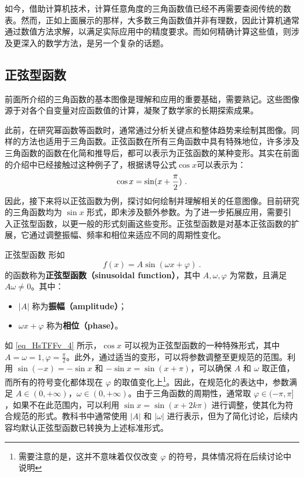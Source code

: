 如今，借助计算机技术，计算任意角度的三角函数值已经不再需要查阅传统的数表。然而，正如上面展示的那样，大多数三角函数值并非有理数，因此计算机通常通过数值方法求解，以满足实际应用中的精度要求。而如何精确计算这些值，则涉及更深入的数学方法，是另一个复杂的话题。

\subsection{正弦型函数}

前面所介绍的三角函数的基本图像是理解和应用的重要基础，需要熟记。这些图像源于对各个自变量对应函数值的计算，凝聚了数学家的长期探索成果。

此前，在研究幂函数等函数时，通常通过分析关键点和整体趋势来绘制其图像。同样的方法也适用于三角函数。正弦函数在所有三角函数中具有特殊地位，许多涉及三角函数的函数在化简和推导后，都可以表示为正弦函数的某种变形。其实在前面的介绍中已经接触过这种例子了，根据诱导公式$\cos x$可以表示为：
\begin{equation}\label{eq_HsTFFv_4}
\cos x=\sin(x+{\pi\over2})~.
\end{equation}
因此，接下来将以正弦函数为例，探讨如何绘制并理解相关的任意图像。目前研究的三角函数均为 $\sin x$ 形式，即未涉及额外参数。为了进一步拓展应用，需要引入正弦型函数，以更一般的形式刻画这些变形。正弦型函数是对基本正弦函数的扩展，它通过调整振幅、频率和相位来适应不同的周期性变化。

\begin{definition}{正弦型函数}
形如
\begin{equation}
f(x) = A\sin(\omega x + \varphi)~.
\end{equation}
的函数称为\textbf{正弦型函数（sinusoidal function）}，其中 $A, \omega, \varphi$ 为常数，且满足 $A\omega \neq 0$。其中：
\begin{itemize}
\item $|A|$ 称为\textbf{振幅（amplitude）}；
\item $\omega x + \varphi$ 称为\textbf{相位（phase）}。
\end{itemize}
\end{definition}

如 \autoref{eq_HsTFFv_4} 所示，$\cos x$ 可以视为正弦型函数的一种特殊形式，其中 $\displaystyle A = \omega = 1, \varphi = \frac{\pi}{2}$。此外，通过适当的变形，可以将参数调整至更规范的范围。利用 $\sin(-x) = -\sin x$ 和 $-\sin x = \sin(x + \pi)$，可以确保 $A$ 和 $\omega$ 取正值，而所有的符号变化都体现在 $\varphi$ 的取值变化上\footnote{需要注意的是，这并不意味着仅仅改变 $\varphi$ 的符号，具体情况将在后续讨论中说明}。因此，在规范化的表达中，参数满足 $A \in (0, +\infty)$，$\omega \in (0, +\infty)$。由于三角函数的周期性，通常取 $\varphi \in (-\pi, \pi]$，如果不在此范围内，可以利用 $\sin x = \sin(x + 2k\pi)$ 进行调整，使其化为符合规范的形式。教科书中通常使用 $|A|$ 和 $|\omega|$ 进行表示，但为了简化讨论，后续内容均默认正弦型函数已转换为上述标准形式。

